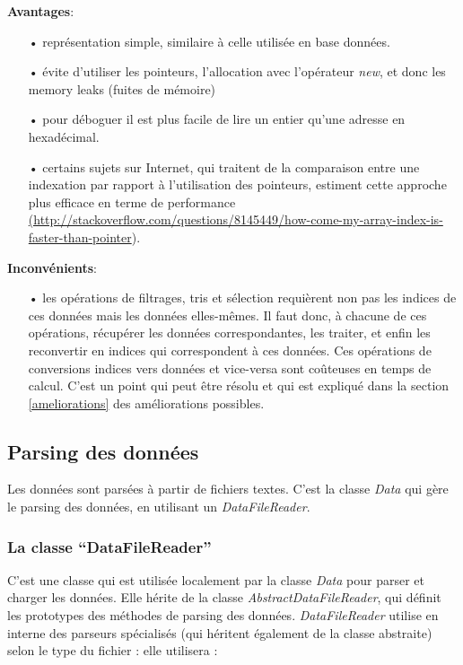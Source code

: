 \documentclass[12pt]{article}
\begin{document}
		\textbf{Avantages}:
		\begin{itemize}
			\item[•] représentation simple, similaire à celle utilisée en base données.
			\item[•] évite d’utiliser les pointeurs, l’allocation avec l’opérateur \textit{new}, et donc les memory leaks (fuites de mémoire)
			\item[•] pour déboguer il est plus facile de lire un entier qu’une adresse
			en hexadécimal.
			\item[•] certains sujets sur Internet, qui traitent de la comparaison entre
			une indexation par rapport à l’utilisation des pointeurs, estiment
			cette approche plus efficace en terme de performance
			\sloppy
			\url{(http://stackoverflow.com/questions/8145449/how-come-my-array-index-is-faster-than-pointer}).\\
		\end{itemize}
			
		\textbf{Inconvénients}:
		\begin{itemize}
			\item[•] les opérations de filtrages, tris et sélection requièrent non pas les
			indices de ces données mais les données elles-mêmes. Il faut donc, à chacune de
			ces opérations, récupérer les données correspondantes, les traiter, et enfin
			les reconvertir en indices qui correspondent à ces données. Ces opérations
			de conversions indices vers données et vice-versa sont coûteuses en temps
			de calcul. C’est un point qui peut être résolu et qui est expliqué dans
			la section \ref{ameliorations} des améliorations possibles.
		\end{itemize}
			
		\subsection{Parsing des données}
		Les données sont parsées à partir de fichiers textes. C’est la classe \textit{Data} qui
		gère le parsing des données, en utilisant un \textit{DataFileReader}.
					
		\subsubsection{La classe “DataFileReader”}
	C’est une classe qui est utilisée localement par la classe \textit{Data} pour parser et charger les données. Elle hérite de la classe \textit{AbstractDataFileReader}, qui définit les prototypes des méthodes de parsing des données. \textit{DataFileReader} utilise en interne des parseurs spécialisés (qui héritent également de la classe abstraite) selon le type du fichier : elle utilisera :\\
	
\end{document}
